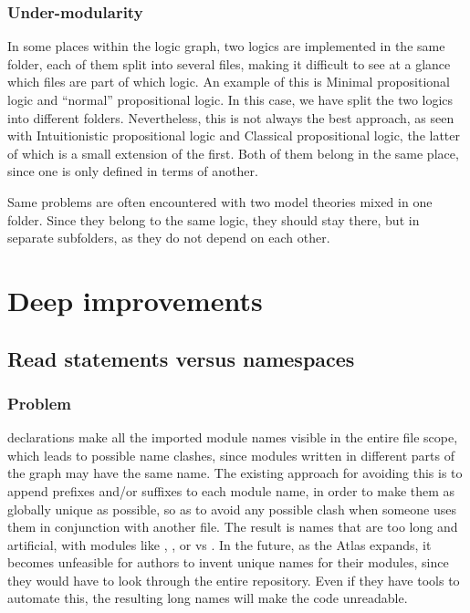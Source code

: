 \subsubsection{Under-modularity}

In some places within the logic graph, two logics are implemented in the same folder, each of them split into several files, making it difficult to see at a glance which files are part of which logic. An example of this is Minimal propositional logic and ``normal'' propositional logic. In this case, we have split the two logics into different folders. Nevertheless, this is not always the best approach, as seen with Intuitionistic propositional logic and Classical propositional logic, the latter of which is a small extension of the first. Both of them belong in the same place, since one is only defined in terms of another.

Same problems are often encountered with two model theories mixed in one folder. Since they belong to the same logic, they should stay there, but in separate subfolders, as they do not depend on each other.



\section{Deep improvements}\label{sec:deep}

\subsection{Read statements versus namespaces}

\subsubsection{Problem}

 declarations make all the imported module names visible in the entire file scope, which leads to possible name clashes, since modules written in different parts of the graph may have the same name. The existing approach for avoiding this is to append prefixes and/or suffixes to each module name, in order to make them as globally unique as possible, so as to avoid any possible clash when someone uses them in conjunction with another file. The result is names that are too long and artificial, with modules like , ,  or  vs . In the future, as the Atlas expands, it becomes unfeasible for  authors to invent unique names for their modules, since they would have to look through the entire repository. Even if they have tools to automate this, the resulting long names will make the code unreadable.

